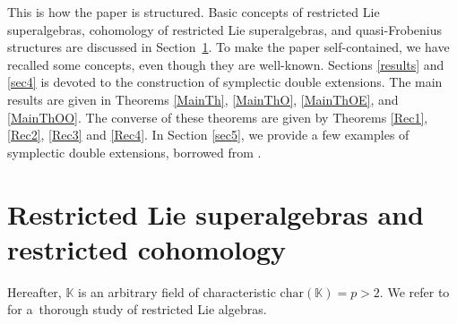 \documentclass[10pt,a4paper]{amsart}
\numberwithin{equation}{section}
\begin{document}
This is how the paper is structured. Basic concepts of restricted Lie superalgebras, cohomology of restricted Lie superalgebras, and quasi-Frobenius structures are discussed in Section~\ref{sec2}. To make the paper self-contained, we have recalled some concepts, even though they are well-known. Sections \ref{results} and \ref{sec4} is devoted to the construction of symplectic double extensions. The main results are given in Theorems \ref{MainTh}, \ref{MainThO}, \ref{MainThOE}, and \ref{MainThOO}. The converse of these theorems are given by Theorems \ref{Rec1}, \ref{Rec2}, \ref{Rec3} and \ref{Rec4}. In Section \ref{sec5}, we provide a few examples of symplectic double extensions, borrowed from \cite{BM, GKN}.

\section{Restricted Lie superalgebras and restricted cohomology}\label{sec2}
Hereafter, $\mathbb{K}$ is an arbitrary field of characteristic $\mathrm{char}(\mathbb{K})=p>2$. We refer to \cite{SF} for a~thorough study of restricted Lie algebras.

\end{document}
